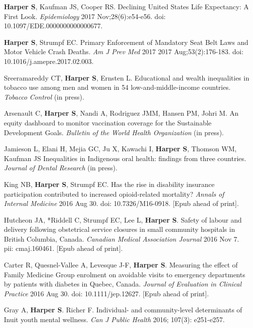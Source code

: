 \documentclass[
  letterpaper,
  DIV=11,
  numbers=noendperiod]{scrartcl}
\begin{document}
\begin{etaremune}
\item \textbf{Harper S}, Kaufman JS, Cooper RS. Declining United States Life Expectancy: A First Look. \emph{Epidemiology} 2017 Nov;28(6):e54-e56. doi: 10.1097/EDE.0000000000000677.

\item \textbf{Harper S}, Strumpf EC. Primary Enforcement of Mandatory Seat Belt Laws and Motor Vehicle Crash Deaths. \emph{Am J Prev Med} 2017 2017 Aug;53(2):176-183. doi: 10.1016/j.amepre.2017.02.003.

\item Sreeramareddy CT, \textbf{Harper S}, Ernsten L. Educational and wealth inequalities in tobacco use among men and women in 54 low-and-middle-income countries. \emph{Tobacco Control} (in press).
 
\item *Arsenault C, \textbf{Harper S}, Nandi A, Rodriguez JMM, Hansen PM, Johri M. An equity dashboard to monitor vaccination coverage for the Sustainable Development Goals. \emph{Bulletin of the World Health Organization} (in press).
 
\item Jamieson L, Elani H, Mejia GC, Ju X, Kawachi I, \textbf{Harper S}, Thomson WM, Kaufman JS Inequalities in Indigenous oral health: findings from three countries. \emph{Journal of Dental Research} (in press).

\item King NB, \textbf{Harper S}, Strumpf EC. Has the rise in disability insurance participation contributed to increased opioid-related mortality? \emph{Annals of Internal Medicine} 2016 Aug 30. doi: 10.7326/M16-0918. [Epub ahead of print].
 
\item Hutcheon JA, *Riddell C, Strumpf EC, Lee L, \textbf{Harper S}. Safety of labour and delivery following obstetrical service closures in small community hospitals in British Columbia, Canada. \emph{Canadian Medical Association Journal} 2016 Nov 7. pii: cmaj.160461. [Epub ahead of print].
 
\item Carter R, Quesnel-Vallee A, Levesque J-F, \textbf{Harper S}. Measuring the effect of Family Medicine Group enrolment on avoidable visits to emergency departments by patients with diabetes in Quebec, Canada. \emph{Journal of Evaluation in Clinical Practice} 2016 Aug 30. doi: 10.1111/jep.12627. [Epub ahead of print].
 
\item *Gray A, \textbf{Harper S}. Richer F. Individual- and community-level determinants of Inuit youth mental wellness. \emph{Can J Public Health} 2016; 107(3): e251-e257.
 

\end{etaremune}
\end{document}
